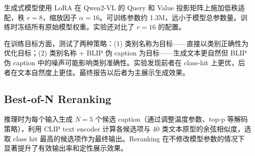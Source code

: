 生成式模型使用 LoRA 在 Qwen2-VL 的 Query 和 Value 投影矩阵上施加低秩适配，秩 $r=8$，缩放因子 $\alpha=16$。可训练参数约 1.3M，远小于模型总参数量。训练时冻结所有原始模型权重。实验还对比了 $r=16$ 的配置。

在训练目标方面，测试了两种策略：(1) 类别名称为目标——直接以类别正确性为优化目标；(2) 类别名称 + BLIP 伪 caption 为目标——生成文本更自然但 BLIP 伪 caption 中的噪声可能影响类别准确性。实验发现前者在 class-hit 上更优，后者在文本自然度上更佳。最终报告以后者为主展示生成效果。

\subsection{Best-of-N Reranking}

推理时为每个输入生成 $N=5$ 个候选 caption（通过调整温度参数、top-p 等解码策略），利用 CLIP text encoder 计算各候选项与 40 类文本原型的余弦相似度，选取 class hit 最高的候选项作为最终输出。Reranking 在不修改模型参数的情况下显著提升了有效输出率和定性展示效果。
